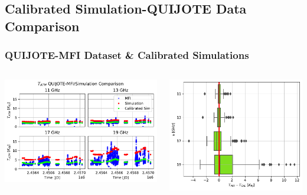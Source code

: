 \documentclass[10pt,aspectratio=169]{beamer}
\begin{document}
\subsection{Calibrated Simulation-QUIJOTE Data Comparison}

\begin{frame}
\frametitle{QUIJOTE-MFI Dataset \& Calibrated Simulations}

\begin{columns}
        \begin{column}{0.59\textwidth}
        \includegraphics[width=1\textwidth]{QUIJOTE-Sim_calibrated}
        \end{column}
        \pause
        \begin{column}{0.39\textwidth}
        \vspace{0.5cm}
        \includegraphics[width=1\textwidth]{QUIJOTE-Sim_calibrated_residuals_boxplot}
        \end{column}
\end{columns}

\end{frame}
\end{document}

